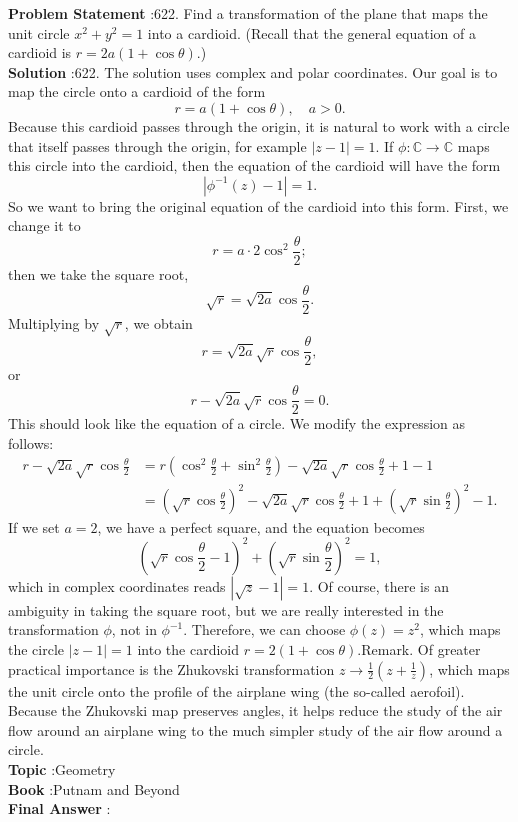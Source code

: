 \documentclass[10pt]{article}
\begin{document}
\textbf{Problem Statement} :622. Find a transformation of the plane that maps the unit circle $x^{2}+y^{2}=1$ into a cardioid. (Recall that the general equation of a cardioid is $r=2 a(1+\cos \theta)$.)\\
\textbf{Solution} :622. The solution uses complex and polar coordinates. Our goal is to map the circle onto a cardioid of the form$$ r=a(1+\cos \theta), \quad a>0 . $$Because this cardioid passes through the origin, it is natural to work with a circle that itself passes through the origin, for example $|z-1|=1$. If $\phi: \mathbb{C} \rightarrow \mathbb{C}$ maps this circle into the cardioid, then the equation of the cardioid will have the form$$ \left|\phi^{-1}(z)-1\right|=1 . $$So we want to bring the original equation of the cardioid into this form. First, we change it to$$ r=a \cdot 2 \cos ^{2} \frac{\theta}{2} ; $$then we take the square root,$$ \sqrt{r}=\sqrt{2 a} \cos \frac{\theta}{2} . $$Multiplying by $\sqrt{r}$, we obtain$$ r=\sqrt{2 a} \sqrt{r} \cos \frac{\theta}{2}, $$or$$ r-\sqrt{2 a} \sqrt{r} \cos \frac{\theta}{2}=0 . $$This should look like the equation of a circle. We modify the expression as follows:$$ \begin{aligned} r-\sqrt{2 a} \sqrt{r} \cos \frac{\theta}{2} &=r\left(\cos ^{2} \frac{\theta}{2}+\sin ^{2} \frac{\theta}{2}\right)-\sqrt{2 a} \sqrt{r} \cos \frac{\theta}{2}+1-1 \\ &=\left(\sqrt{r} \cos \frac{\theta}{2}\right)^{2}-\sqrt{2 a} \sqrt{r} \cos \frac{\theta}{2}+1+\left(\sqrt{r} \sin \frac{\theta}{2}\right)^{2}-1 . \end{aligned} $$If we set $a=2$, we have a perfect square, and the equation becomes$$ \left(\sqrt{r} \cos \frac{\theta}{2}-1\right)^{2}+\left(\sqrt{r} \sin \frac{\theta}{2}\right)^{2}=1, $$which in complex coordinates reads $|\sqrt{z}-1|=1$. Of course, there is an ambiguity in taking the square root, but we are really interested in the transformation $\phi$, not in $\phi^{-1}$. Therefore, we can choose $\phi(z)=z^{2}$, which maps the circle $|z-1|=1$ into the cardioid $r=2(1+\cos \theta)$.Remark. Of greater practical importance is the Zhukovski transformation $z \rightarrow \frac{1}{2}\left(z+\frac{1}{z}\right)$, which maps the unit circle onto the profile of the airplane wing (the so-called aerofoil). Because the Zhukovski map preserves angles, it helps reduce the study of the air flow around an airplane wing to the much simpler study of the air flow around a circle.\\
\textbf{Topic} :Geometry\\
\textbf{Book} :Putnam and Beyond\\
\textbf{Final Answer} :\\
\end{document}
